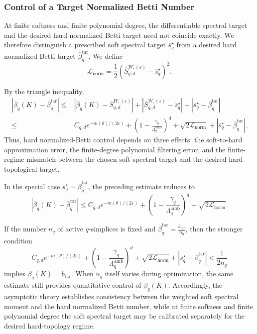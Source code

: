 \documentclass[pdflatex,sn-mathphys-num]{sn-jnl}%
\theoremstyle{thmstyleone}%
\theoremstyle{thmstyletwo}%
\theoremstyle{thmstylethree}%
\begin{document}
\subsubsection{Control of a Target Normalized Betti Number}

At finite softness and finite polynomial degree, the differentiable spectral target and the desired hard normalized Betti target need not coincide exactly.
We therefore distinguish a prescribed soft spectral target
$\overline s_q^\star$
from a desired hard normalized Betti target
$\overline\beta_q^{\mathrm{tar}}$.
We define
\[
\mathcal L_{\mathrm{norm}}
=
\frac12
\left(
\overline S_{q,d}^{W,(\varepsilon)}
-
\overline s_q^\star
\right)^2.
\]

By the triangle inequality,
\[
\begin{aligned}
\left|
\overline\beta_q(K)
-
\overline\beta_q^{\mathrm{tar}}
\right|
\le{}&
\left|
\overline\beta_q(K)
-
\overline S_{q,d}^{W,(\varepsilon)}
\right|
+
\left|
\overline S_{q,d}^{W,(\varepsilon)}
-
\overline s_q^\star
\right|
+
\left|
\overline s_q^\star
-
\overline\beta_q^{\mathrm{tar}}
\right|\\
\le{}&
C_{q,d}
e^{-m(\theta)/(2\varepsilon)}
+
\left(
1-
\frac{
\gamma_q
}{
\Lambda_q^{\mathrm{amb}}
}
\right)^d
+
\sqrt{
2\mathcal L_{\mathrm{norm}}
}
+
\left|
\overline s_q^\star
-
\overline\beta_q^{\mathrm{tar}}
\right|.
\end{aligned}
\]
Thus, hard normalized-Betti control depends on three effects:
the soft-to-hard approximation error, the finite-degree polynomial filtering error, and the finite-regime mismatch between the chosen soft spectral target and the desired hard topological target.

In the special case
$\overline s_q^\star
=
\overline\beta_q^{\mathrm{tar}}$,
the preceding estimate reduces to
\[
\left|
\overline\beta_q(K)
-
\overline\beta_q^{\mathrm{tar}}
\right|
\le
C_{q,d}
e^{-m(\theta)/(2\varepsilon)}
+
\left(
1-
\frac{
\gamma_q
}{
\Lambda_q^{\mathrm{amb}}
}
\right)^d
+
\sqrt{
2\mathcal L_{\mathrm{norm}}
}.
\]

If the number \(n_q\) of active \(q\)-simplices is fixed and
$\overline\beta_q^{\mathrm{tar}}
=
\frac{
b_{\mathrm{tar}}
}{
n_q
}$,
then the stronger condition
\[
C_{q,d}
e^{-m(\theta)/(2\varepsilon)}
+
\left(
1-
\frac{
\gamma_q
}{
\Lambda_q^{\mathrm{amb}}
}
\right)^d
+
\sqrt{
2\mathcal L_{\mathrm{norm}}
}
+
\left|
\overline s_q^\star
-
\overline\beta_q^{\mathrm{tar}}
\right|
<
\frac{1}{2n_q}
\]
implies
$\beta_q(K)
=
b_{\mathrm{tar}}$.
When \(n_q\) itself varies during optimization, the same estimate still provides quantitative control of $\overline\beta_q(K)$.
Accordingly, the asymptotic theory establishes consistency between the weighted soft spectral moment and the hard normalized Betti number, while at finite softness and finite polynomial degree the soft spectral target may be calibrated separately for the desired hard-topology regime.
\end{document}
